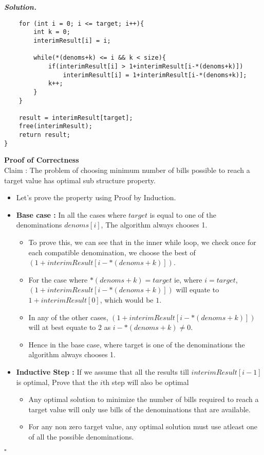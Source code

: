 \documentclass[12pt]{article}
\newenvironment{solution}[1][\it{Solution}]{\textbf{#1. } }{$\square$}
\begin{document}
\begin{solution}
\begin{verbatim}
    for (int i = 0; i <= target; i++){
        int k = 0;
        interimResult[i] = i;
        
        while(*(denoms+k) <= i && k < size){
            if(interimResult[i] > 1+interimResult[i-*(denoms+k)])
                interimResult[i] = 1+interimResult[i-*(denoms+k)];
            k++;
        }
    }
    
    result = interimResult[target];
    free(interimResult);
    return result;
}
\end{verbatim}

\textbf{Proof of Correctness}\\ 
\indent Claim : The problem of choosing minimum number of bills possible to reach a target value has optimal sub structure property. 
\begin{itemize}
    \item  Let's prove the property using Proof by Induction. 
    \item \textbf{Base case : } In all the cases where $target$ is equal to one of the denominations $denoms[i]$, The algorithm always chooses 1. 
    \begin{itemize}
        \item To prove this, we can see that in the inner while loop, we check once for each compatible denomination, we choose the best of $(1+interimResult[i-*(denoms+k)])$. 
        \item For the case where $*(denoms+k) = target$ ie, where $i=target$, $(1+interimResult[i-*(denoms+k)])$ will equate to $1+interimResult[0]$, which would be $1$. 
        \item In any of the other cases, $(1+interimResult[i-*(denoms+k)])$ will at best equate to 2 as $i-*(denoms+k) \neq 0$. 
        \item Hence in the base case, where target is one of the denominations the algorithm always chooses 1.
    \end{itemize}
    \item \textbf{Inductive Step : } If we assume that all the results till $interimResult[i-1]$ is optimal, Prove that the $i$th step will also be optimal
    \begin{itemize}
        \item Any optimal solution to minimize the number of bills required to reach a target value will only use bills of the denominations that are available. 
        \item For any non zero target value, any optimal solution must use atleast one of all the possible denominations. 

\end{itemize}
\end{itemize}
\end{solution}
\end{document}
